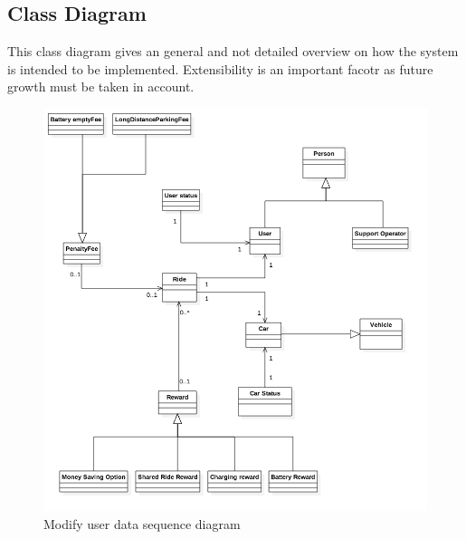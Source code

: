 \documentclass[12pt]{article}
\begin{document}
 	 	\subsection{Class Diagram}
 	 	This class diagram gives an general and not detailed overview on how the system is intended to be implemented. Extensibility is an important facotr as future growth must be taken in account.
 	 	\begin{figure}[htbp]
		\begin{center}
		\caption{Modify user data sequence diagram}
		\includegraphics[scale=0.51]{Images/ClassDiagram/General.png}
		\end{center} 	 	
 	 	\end{figure}
 	 	\clearpage
		
		
\end{document}
